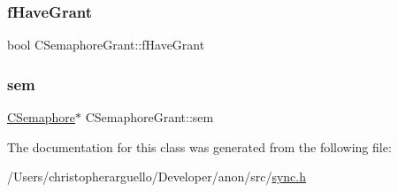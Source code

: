 \subsubsection{\texorpdfstring{f\+Have\+Grant}{fHaveGrant}}
{\footnotesize\ttfamily bool C\+Semaphore\+Grant\+::f\+Have\+Grant\hspace{0.3cm}{\ttfamily [private]}}

\mbox{\label{class_c_semaphore_grant_afed7f1f7ac912c175dcd9c898fa4e2ed}} 
\subsubsection{\texorpdfstring{sem}{sem}}
{\footnotesize\ttfamily \mbox{\hyperlink{class_c_semaphore}{C\+Semaphore}}$\ast$ C\+Semaphore\+Grant\+::sem\hspace{0.3cm}{\ttfamily [private]}}



The documentation for this class was generated from the following file\+:\begin{DoxyCompactItemize}
\item 
/\+Users/christopherarguello/\+Developer/anon/src/\mbox{\hyperlink{sync_8h}{sync.\+h}}\end{DoxyCompactItemize}
